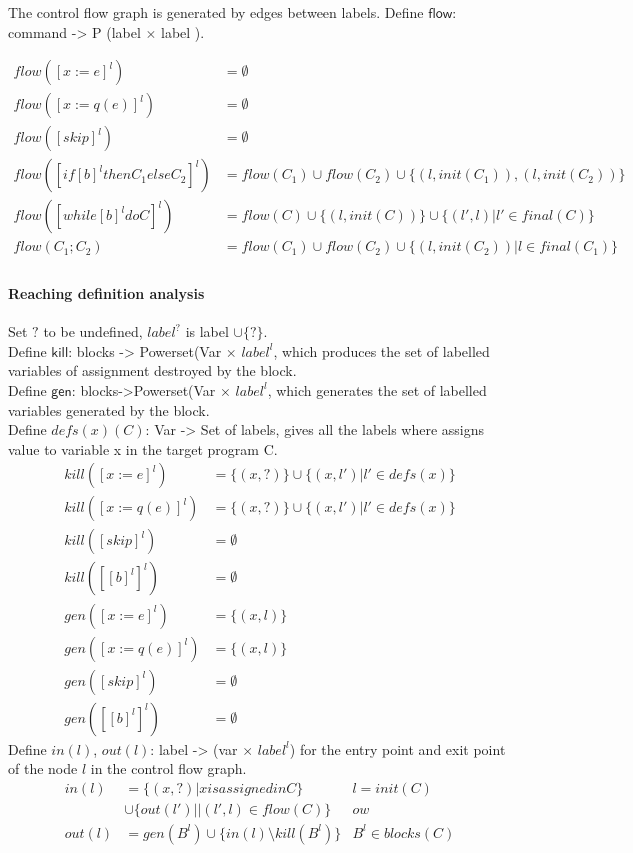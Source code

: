 The control flow graph is generated by edges between labels. Define $\mathsf{flow}$: command -> P (label $\times$ label ).

\[
 \begin{array}{ll}
    flow([x := e]^{l})  & = \emptyset  \\
     flow([x := q(e)]^{l})  & = \emptyset  \\
     flow([skip]^{l})  & = \emptyset \\
     flow([if [b]^l then C_1 else C_2]^{l})  & =  flow(C_1) \cup flow(C_2)\cup \{(l, init(C_1)) , (l, init(C_2)) \} \\
     flow([while [b]^l do C]^{l})  & =  flow(C) \cup \{(l, init(C)) \} \cup \{(l', l)| l' \in final(C) \} \\
     flow(C_1 ; C_2)  & = flow(C_1) \cup  flow(C_2) \cup \{ (l,init(C_2)) | l \in final(C_1) \} \\
 \end{array}
 \]
 
 \paragraph{Reaching definition analysis}
 Set $?$ to be undefined, $label^{?}$ is label $\cup \{?\}$.\\
 Define $\mathsf{kill}$: blocks -> Powerset(Var $\times$ $label^l$, which produces the set of labelled variables of assignment destroyed by the block.\\
 Define $\mathsf{gen}$: blocks->Powerset(Var $\times$ $label^l$, which generates the set of labelled variables generated by the block.\\
 Define $defs(x)(C)$: Var -> Set of labels, gives all the labels where assigns value to variable x in the target program C.
  \[
 \begin{array}{ll}
    kill([x := e]^{l})  & = \{ (x, ?) \} \cup \{ (x, l') | l' \in defs(x) \} \\
     kill([x := q(e)]^{l})  & = \{ (x, ?) \} \cup \{ (x, l') | l' \in defs(x) \}  \\
     kill([skip]^{l})  & = \emptyset \\
     kill([ [b]^l ]^{l})  & =  \emptyset \\
      gen([x := e]^{l})  & = \{ (x, l) \}  \\
     gen([x := q(e)]^{l})  & = \{ (x, l) \}  \\
     gen([skip]^{l})  & = \emptyset \\
     gen([ [b]^l ]^{l})  & =  \emptyset 
 \end{array}
 \]
 Define $in(l)$, $out(l)$: label -> (var $\times$ $label^l$) for the entry point and exit point of the node $l$ in the control flow graph.
 \[
 \begin{array}{lll}
    in(l)  & = \{ (x, ?) | x is assigned in C  \} & l = init(C)\\
    & \cup \{ out(l')|  | (l',l) \in flow(C) \} & ow \\
     out(l)  & =  gen(B^{l}) \cup \{ in(l) \setminus kill(B^l)  \} & B^l \in blocks(C)   
 \end{array}
 \]
 

